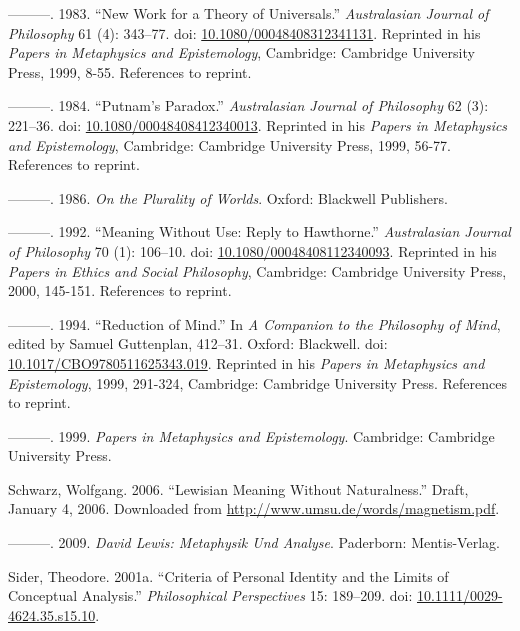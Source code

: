 \documentclass[
  10pt,
  letterpaper,
  DIV=11,
  numbers=noendperiod,
  twoside]{scrartcl}
\newlength{\cslhangindent}
\newenvironment{CSLReferences}[2] %
 {\begin{list}{}{%
  \setlength{\itemindent}{0pt}
  \setlength{\leftmargin}{0pt}
  \setlength{\parsep}{0pt}
  \ifodd #1
   \setlength{\leftmargin}{\cslhangindent}
   \setlength{\itemindent}{-1\cslhangindent}
  \fi
  \setlength{\itemsep}{#2\baselineskip}}}
 {\end{list}}
\begin{document}
\begin{CSLReferences}{1}{0}
---------. 1983. {``New Work for a Theory of Universals.''}
\emph{Australasian Journal of Philosophy} 61 (4): 343--77. doi:
\href{https://doi.org/10.1080/00048408312341131}{10.1080/00048408312341131}.
Reprinted in his \emph{Papers in Metaphysics and Epistemology},
Cambridge: Cambridge University Press, 1999, 8-55. References to
reprint.

---------. 1984. {``Putnam's Paradox.''} \emph{Australasian Journal of
Philosophy} 62 (3): 221--36. doi:
\href{https://doi.org/10.1080/00048408412340013}{10.1080/00048408412340013}.
Reprinted in his \emph{Papers in Metaphysics and Epistemology},
Cambridge: Cambridge University Press, 1999, 56-77. References to
reprint.

---------. 1986. \emph{On the Plurality of Worlds}. Oxford: Blackwell
Publishers.

---------. 1992. {``Meaning Without Use: Reply to {H}awthorne.''}
\emph{Australasian Journal of Philosophy} 70 (1): 106--10. doi:
\href{https://doi.org/10.1080/00048408112340093}{10.1080/00048408112340093}.
Reprinted in his \emph{Papers in Ethics and Social Philosophy},
Cambridge: Cambridge University Press, 2000, 145-151. References to
reprint.

---------. 1994. {``Reduction of Mind.''} In \emph{A Companion to the
Philosophy of Mind}, edited by Samuel Guttenplan, 412--31. Oxford:
Blackwell. doi:
\href{https://doi.org/10.1017/CBO9780511625343.019}{10.1017/CBO9780511625343.019}.
Reprinted in his \emph{Papers in Metaphysics and Epistemology}, 1999,
291-324, Cambridge: Cambridge University Press. References to reprint.

---------. 1999. \emph{Papers in Metaphysics and Epistemology}.
Cambridge: Cambridge University Press.

Schwarz, Wolfgang. 2006. {``Lewisian Meaning Without Naturalness.''}
Draft, January 4, 2006. Downloaded from
\url{http://www.umsu.de/words/magnetism.pdf}.

---------. 2009. \emph{David Lewis: Metaphysik Und Analyse}. Paderborn:
Mentis-Verlag.

Sider, Theodore. 2001a. {``Criteria of Personal Identity and the Limits
of Conceptual Analysis.''} \emph{Philosophical Perspectives} 15:
189--209. doi:
\href{https://doi.org/10.1111/0029-4624.35.s15.10}{10.1111/0029-4624.35.s15.10}.


\end{CSLReferences}
\end{document}
